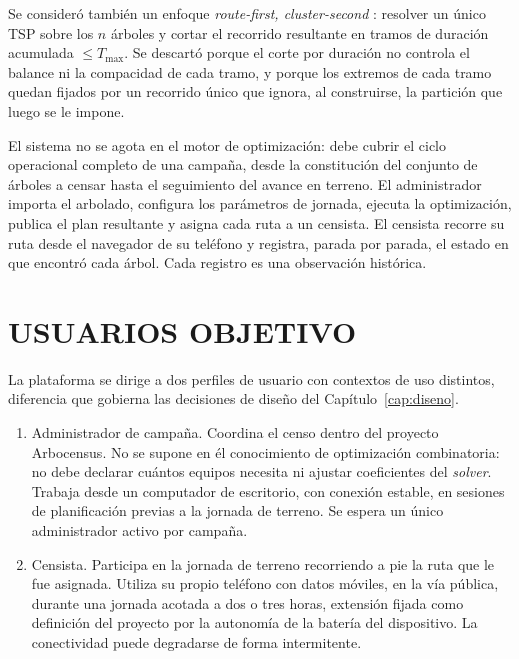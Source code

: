 Se consideró también un enfoque \textit{route-first, cluster-second} \citep{beasley1983route}:
resolver un único TSP sobre
los $n$ árboles y cortar el recorrido resultante en tramos de duración acumulada $\leq T_{\max}$. Se
descartó porque el corte por duración no controla el balance ni la compacidad de cada tramo, y
porque los extremos de cada tramo quedan fijados por un recorrido único que ignora, al construirse,
la partición que luego se le impone.

El sistema no se agota en el motor de optimización: debe cubrir el ciclo operacional completo de
una campaña, desde la constitución del conjunto de árboles a censar hasta el seguimiento del avance
en terreno. El administrador importa el arbolado, configura los parámetros de jornada,
ejecuta la optimización, publica el plan resultante y asigna cada ruta a un censista. El censista
recorre su ruta desde el navegador de su teléfono y registra, parada por parada, el estado en que
encontró cada árbol. Cada registro es una observación histórica.

\section{USUARIOS OBJETIVO}
\label{sec:usuarios}

La plataforma se dirige a dos perfiles de usuario con contextos de uso distintos, diferencia que
gobierna las decisiones de diseño del Capítulo~\ref{cap:diseno}.

\begin{enumerate}
  \item Administrador de campaña. Coordina el censo dentro del proyecto Arbocensus. No se supone en
        él conocimiento de optimización combinatoria: no debe declarar cuántos equipos
        necesita ni ajustar coeficientes del \textit{solver}. Trabaja desde un
        computador de escritorio, con conexión estable, en sesiones de planificación previas a la
        jornada de terreno. Se espera un único administrador activo por campaña.
  \item Censista. Participa en la jornada de terreno recorriendo a pie la ruta que le fue asignada.
        Utiliza su propio teléfono con datos móviles, en la vía pública, durante una jornada acotada
        a dos o tres horas, extensión fijada como definición del proyecto por la autonomía de la
        batería del dispositivo. La conectividad puede degradarse de forma intermitente.
\end{enumerate}

